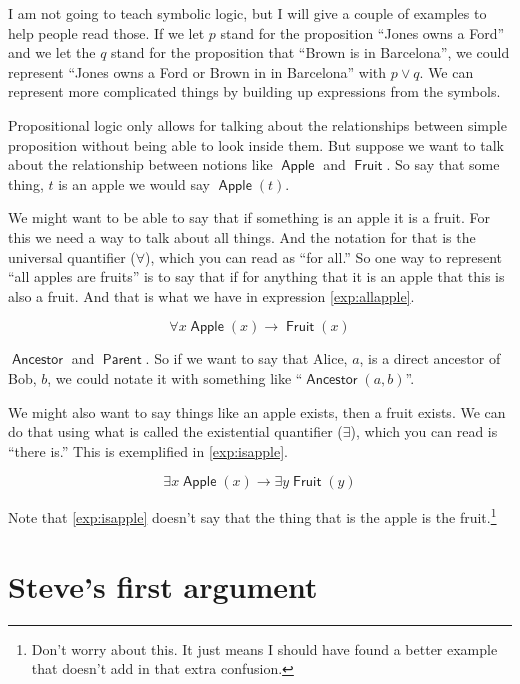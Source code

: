 \documentclass[12pt]{article}
\providecommand{\lor}{\vee}
\providecommand{\lif}{\rightarrow}
\providecommand{\lall}{\forall}
\providecommand{\lis}{\exists}
\newcommand{\rel}[1]{\ensuremath{\mathop{\mathsf{#1}}}}
\newcommand{\rlan}{\rel{Ancestor}}
\newcommand{\rlpt}{\rel{Parent}}
\newcommand{\rlapple}{\rel{Apple}}
\newcommand{\rlfruit}{\rel{Fruit}}
\begin{document}
I am not going to teach symbolic logic, but I will give a couple of examples to help people read those. If we let $p$ stand for the proposition “Jones owns a Ford” and we let the $q$ stand for the proposition that “Brown is in Barcelona”, we could represent “Jones owns a Ford or Brown in in Barcelona” with $p \lor q$.
We can represent more complicated things by building up expressions from the symbols.

Propositional logic only allows for talking about the relationships between simple proposition without being able to look inside them.
But suppose we want to talk about the relationship between notions like $\rlapple$ and $\rlfruit$. So say that some thing, $t$ is an apple we would say $\rlapple(t)$.

We might want to be able to say that if something is an apple it is a fruit.
For this we need a way to talk about all things. And the notation for that is the universal quantifier ($\lall$), which you can read as “for all.” So one way to represent “all apples are fruits” is to say that if for anything that it is an apple that this is also a fruit. And that is what we have in expression \ref{exp:allapple}.

\begin{equation}\label{exp:allapple}
    \lall x \rlapple(x) \lif \rlfruit(x)
\end{equation}

$\rlan$ and $\rlpt$. So if we want to say that Alice, $a$, is a direct ancestor of Bob, $b$, we could notate it with something like “$\rlan(a, b)$”.

We might also want to say things like an apple exists, then a fruit exists.
We can do that using what is called the existential quantifier ($\lis$), which you can read is “there is.” This is exemplified in \ref{exp:isapple}.

\begin{equation}\label{exp:isapple}
    \lis x \rlapple(x) \lif \lis y \rlfruit(y)
\end{equation}

Note that \ref{exp:isapple} doesn't say that the thing that is the apple is the fruit.\footnote{Don't worry about this. It just means I should have found a better example that doesn't add in that extra confusion.}

\section{Steve's first argument}\label{sec:first}
\end{document}
